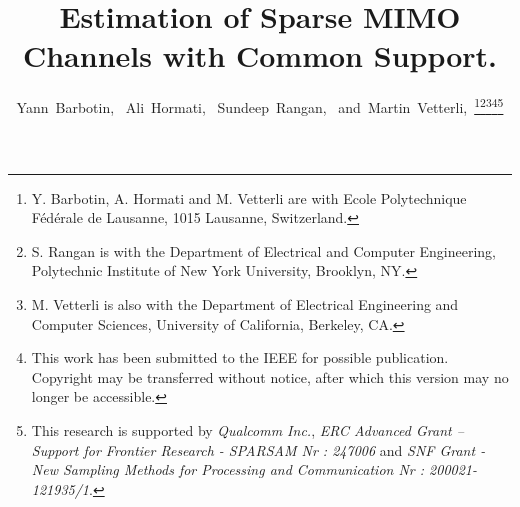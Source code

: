 \documentclass[journal,10pt]{IEEEtran}
\begin{document}
\title{Estimation of Sparse MIMO Channels with Common Support.}


\author{Yann~Barbotin,~
        Ali~Hormati,~
        Sundeep~Rangan,~
        and~Martin~Vetterli,~\thanks{Y. Barbotin, A. Hormati and M. Vetterli are with Ecole Polytechnique F\'{e}d\'{e}rale de Lausanne, 1015 Lausanne, Switzerland.}\thanks{S. Rangan is with the Department of Electrical and Computer Engineering, Polytechnic Institute of New York University, Brooklyn, NY.}\thanks{M. Vetterli is also with the Department of
Electrical Engineering and Computer Sciences, University of
California, Berkeley, CA.}\thanks{This work has been submitted to the IEEE for possible publication. Copyright may be transferred without notice, after which this version may no longer be accessible.}\thanks{This research is supported by \emph{Qualcomm Inc.}, \emph{ERC Advanced Grant – Support for Frontier Research - SPARSAM Nr : 247006} and \emph{SNF Grant - New Sampling Methods for Processing and Communication Nr : 200021-121935/1}.}}

	



















\maketitle
\end{document}
